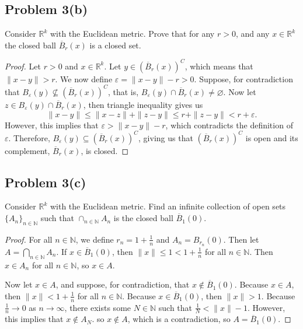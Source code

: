 \documentclass[12pt]{article}
\newenvironment{problem}
    {\begin{lrbox}{\mybox}\begin{minipage}{\textwidth-10pt}}
    {\end{minipage}\end{lrbox}\framebox[6.5in]{\usebox{\mybox}}}
\newcommand{\clo}[1]{\overline{#1}}
\newcommand{\<}{\left\langle}
\renewcommand{\>}{\right\rangle}
\newcommand{\N}{\mathbb{N}}
\newcommand{\R}{\mathbb{R}}
\let\eps\varepsilon
\let\emptyset\varnothing
\begin{document}
\subsection*{Problem 3(b)}
\begin{problem}
    Consider $\R^k$ with the Euclidean metric. Prove that for any $r>0$, and any $x \in \R^k$ the closed ball $\overline{B}_r(x)$ is a closed set.
\end{problem}

\begin{proof}
    Let $r>0$ and $x\in\R^k$. Let $y\in (\clo{B}_r(x))^C$, which means that $\|x - y\| > r$. We now define $\eps = \|x-y\| - r > 0$. Suppose, for contradiction that $B_\eps(y) \not\subseteq (\clo{B}_r(x))^C$, that is, $B_\eps(y)\cap \clo{B}_r(x) \ne \emptyset$. Now let $z\in B_\eps(y)\cap \clo{B}_r(x)$, then triangle inequality gives us
    \[\|x - y\| \leq \|x - z\| + \|z - y\| \leq r + \|z - y\| < r + \eps.\]
    However, this implies that $\eps > \|x-y\| - r$, which contradicts the definition of $\eps$. Therefore, $B_\eps(y) \subseteq (\clo{B}_r(x))^C$, giving us that $(\clo{B}_r(x))^C$ is open and its complement, $\clo{B}_r(x)$, is closed.
    
\end{proof}

\subsection*{Problem 3(c)}
\begin{problem}
    Consider $\R^k$ with the Euclidean metric. Find an infinite collection of open sets $\{A_n\}_{n\in\N}$ such that $\cap_{n\in\N}A_n$ is the closed ball $\overline{B}_1(0)$.
\end{problem}

\begin{proof}
    For all $n\in\N$, we define $r_n = 1 + \frac1n$ and $A_n = B_{r_n}(0)$. Then let $A = \bigcap_{n\in\N}A_n$. If $x\in \clo{B}_1(0)$, then $\|x\| \leq 1 < 1+\frac1n$ for all $n\in\N$. Then $x\in A_n$ for all $n\in\N$, so $x\in A$.
    
    Now let $x\in A$, and suppose, for contradiction, that $x\notin\clo{B}_1(0)$. Because $x\in A$, then $\|x\| < 1 + \frac1n$ for all $n\in\N$. Because $x\in\clo{B}_1(0)$, then $\|x\|> 1$. Because $\frac1n\to 0$ as $n\to \infty$, there exists some $N\in\N$ such that $\frac1N < \|x\| - 1$. However, this implies that $x\notin A_N$. so $x\notin A$, which is a contradiction, so $A=\clo{B}_1(0)$.
    
\end{proof}
\end{document}
